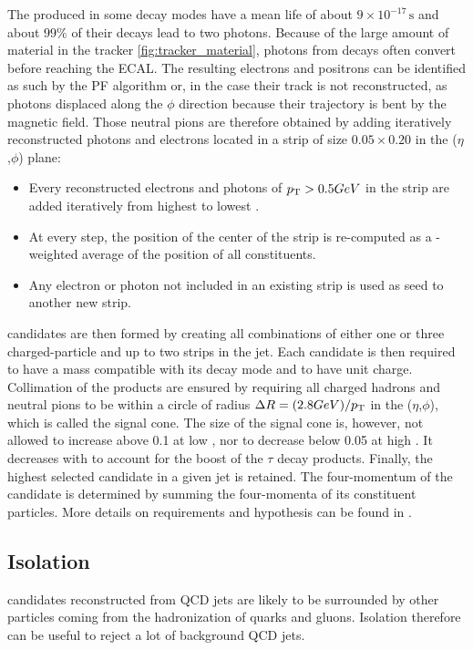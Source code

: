 The \pizero produced in some decay modes have a mean life of about $9 \times 10^{-17}\,\mathrm{s}$ and about $99\%$ of their decays lead to two photons. Because of the large amount of material in the tracker \ref{fig:tracker_material}, photons from \pizero decays often convert before reaching the ECAL. The resulting electrons and positrons can be identified as such by the PF algorithm or, in the case their track is not reconstructed, as photons displaced along the $\phi$ direction because their trajectory is bent by the magnetic field.
Those neutral pions are therefore obtained by adding iteratively reconstructed photons and electrons located in a strip of size $0.05 \times 0.20$ in the ($\eta$,$\phi$) plane:
\begin{itemize}
    \item Every reconstructed electrons and photons of $p_{\mathrm{T}} > 0.5 GeV$ in the strip are added iteratively from highest to lowest \pt.
    \item At every step, the position of the center of the strip is re-computed as a \pt-weighted average of the position of all constituents.
    \item Any electron or photon not included in an existing strip is used as seed to another new strip.
\end{itemize}

\tauh candidates are then formed by creating all combinations of either one or three charged-particle and up to two strips in the jet.
Each \tauh candidate is then required to have a mass compatible with its decay mode and to have unit charge.
Collimation of the products are ensured by requiring all charged hadrons and neutral pions to be within a circle of radius $\Delta R = (2.8 GeV)/p_{\mathrm{T}}$ in the ($\eta$,$\phi$), which is called the signal cone.
The size of the signal cone is, however, not allowed to increase above 0.1 at low \pt, nor to decrease below 0.05 at high \pt. It decreases with \pt to account for the boost of the $\tau$ decay products. Finally, the highest \pt selected \tauh candidate in a given jet is retained. The four-momentum of the \tauh candidate is determined by summing the four-momenta of its constituent particles.
More details on requirements and hypothesis can be found in \cite{tauh_reconstruction}.

\subsection{Isolation}


\tauh candidates reconstructed from QCD jets are likely to be surrounded by other particles coming from the hadronization of quarks and gluons.
Isolation therefore can be useful to reject a lot of background QCD jets.

